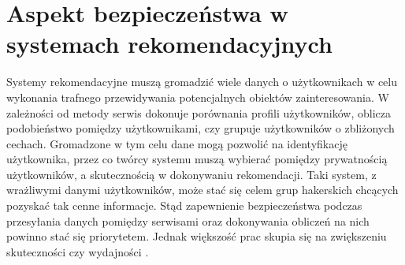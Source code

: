 \chapter{Aspekt bezpieczeństwa w systemach rekomendacyjnych}
Systemy rekomendacyjne muszą gromadzić wiele danych o użytkownikach w celu wykonania trafnego przewidywania potencjalnych obiektów zainteresowania. W zależności od metody serwis dokonuje porównania  profili użytkowników, oblicza podobieństwo pomiędzy użytkownikami, czy grupuje użytkowników o zbliżonych cechach. Gromadzone w tym celu dane mogą pozwolić na identyfikację użytkownika, przez co twórcy systemu muszą wybierać pomiędzy prywatnością użytkowników, a skutecznością w dokonywaniu rekomendacji. Taki system, z wrażliwymi danymi użytkowników, może stać się celem grup hakerskich chcących pozyskać tak cenne informacje. Stąd zapewnienie bezpieczeństwa podczas przesyłania danych pomiędzy serwisami oraz dokonywania obliczeń na nich powinno stać się priorytetem. Jednak większość prac skupia się na zwiększeniu skuteczności czy wydajności \cite{recent_developments}.

